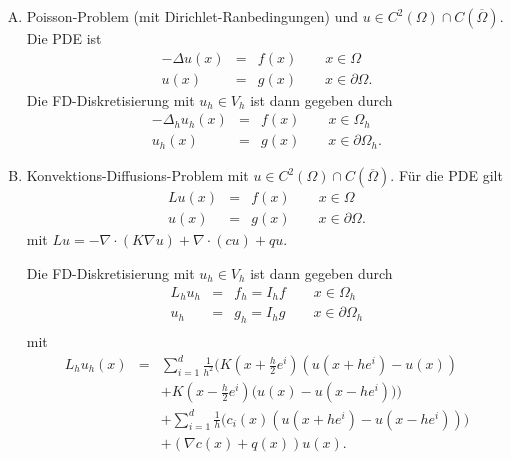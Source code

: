 \begin{enumerate}[A)]
    \item 	
	Poisson-Problem (mit Dirichlet-Ranbedingungen) und $u\in
	C^2(\Omega) \cap C(\overline\Omega)$. Die PDE ist
	\begin{eqnarray*}
            -\Delta u(x)
	    &=& f(x) \qquad x\in \Omega \\
            u(x)
	    &=& g(x) \qquad x\in \partial\Omega.
	\end{eqnarray*}
	Die FD-Diskretisierung mit $u_h\in V_h$ ist dann gegeben durch
	\begin{eqnarray*}
            -\Delta_h u_h(x)
	    &=& f(x) \qquad x\in \Omega_h \\
            u_h(x)
	    &=& g(x) \qquad x\in \partial\Omega_h.
	\end{eqnarray*}
     \item
	Konvektions-Diffusions-Problem mit $u\in C^2(\Omega) \cap
    C(\overline\Omega)$.
	Für die PDE gilt
	\begin{eqnarray*}
            L u(x)
	    &=& f(x) \qquad x\in \Omega \\
            u(x)
	    &=& g(x) \qquad x\in \partial\Omega.
	\end{eqnarray*}
    mit $Lu = -\nabla \cdot (K\nabla u) + \nabla \cdot (cu) + qu$.

	Die FD-Diskretisierung mit $u_h\in V_h$ ist dann gegeben durch
	\begin{eqnarray*}
            L_h u_h
	    &=& f_h = I_h f \qquad x\in \Omega_h \\
            u_h
	    &=& g_h = I_h g \qquad x\in \partial\Omega_h \\
	\end{eqnarray*}
    mit
    \begin{eqnarray*}
            L_h u_h(x)
        &=& \sum_{i=1}^d \frac{1}{h^2} \biggl(K\left(x + \frac{h}{2} e^i\right)
            \left( u(x + h e^i) - u(x) \right) \\ 
            && + K\left(x - \frac{h}{2} e^i\right)\bigl(u(x)
               - u(x - h e^i) \bigr) \biggr) \\
            && + \sum_{i=1}^d  \frac{1}{h}  \big(c_i(x)
                 \left(u(x + h e^i)
               - u(x - h e^i)\right)\big) \\
            && + (\nabla c(x) + q(x)) u(x).
    \end{eqnarray*}
\end{enumerate}


